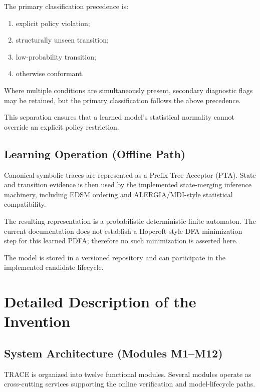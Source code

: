 \documentclass[11pt,a4paper]{article}
\begin{document}
The primary classification precedence is:

\begin{enumerate}
\item explicit policy violation;
\item structurally unseen transition;
\item low-probability transition;
\item otherwise conformant.
\end{enumerate}

Where multiple conditions are simultaneously present, secondary diagnostic flags may be
retained, but the primary classification follows the above precedence.

This separation ensures that a learned model's statistical normality cannot override an
explicit policy restriction.

\subsection{Learning Operation (Offline Path)}

Canonical symbolic traces are represented as a Prefix Tree Acceptor (PTA). State and
transition evidence is then used by the implemented state-merging inference machinery,
including EDSM ordering and ALERGIA/MDI-style statistical compatibility.

The resulting representation is a probabilistic deterministic finite automaton. The
current documentation does not establish a Hopcroft-style DFA minimization step for this
learned PDFA; therefore no such minimization is asserted here.

The model is stored in a versioned repository and can participate in the implemented
candidate lifecycle.

\section{Detailed Description of the Invention}

\subsection{System Architecture (Modules M1--M12)}

TRACE is organized into twelve functional modules. Several modules operate as
cross-cutting services supporting the online verification and model-lifecycle paths.
\end{document}
